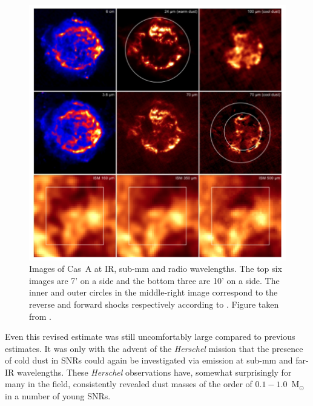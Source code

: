 \begin{figure}
\centering
\includegraphics[clip=true,scale=0.425,trim= 0 0 0 0]{chapters/chapter1/figs/CasA.png}
\caption{Images of Cas~A at IR, sub-mm and radio wavelengths.  The top six images are 7' on a side and the bottom three are 10' on a side.  The inner and outer circles in the middle-right image correspond to the reverse and forward shocks respectively according to \citep{Gotthelf2001}.  Figure taken from \citet{Barlow2010}.}
\label{fig:CasA}
\end{figure}


Even this revised estimate was still uncomfortably large compared to previous estimates.  
It was only with the advent of the \textit{Herschel} mission that the presence of cold dust in SNRs could again be investigated via emission at sub-mm and far-IR wavelengths.  These \textit{Herschel} observations have, somewhat surprisingly for many in the field, consistently revealed dust masses of the order of $0.1-1.0$~M$_{\odot}$ in a number of young SNRs.


